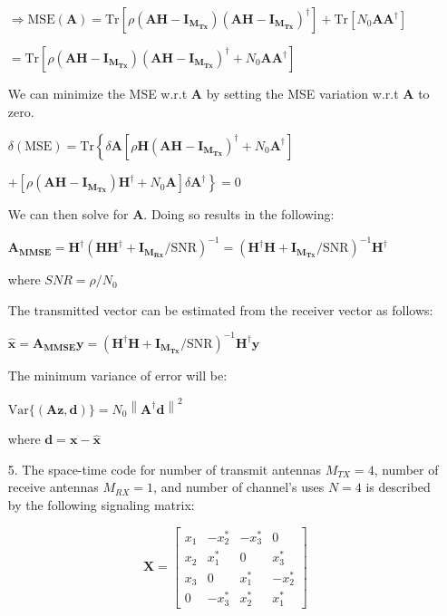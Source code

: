\documentclass[fleqn]{article}
\makeatletter
\newcommand{\norm}[1]{\left \lVert #1 \right \rVert}
\newenvironment{equationCenter}{\@fleqnfalse\begin{equation*}}{\end{equation*}}
\makeatother
\begin{document}
\begin{enumerate}
		$\Rightarrow \text{MSE}(\mathbf{A}) = \text{Tr}[\rho(\mathbf{AH} - \mathbf{I_{M_{Tx}}})(\mathbf{AH} - \mathbf{I_{M_{Tx}}})^{\dagger}] + \text{Tr}[N_0\mathbf{AA^{\dagger}}]$
		
		$ = \text{Tr}[\rho(\mathbf{AH} - \mathbf{I_{M_{Tx}}})(\mathbf{AH} - \mathbf{I_{M_{Tx}}})^{\dagger} + N_0\mathbf{AA^{\dagger}}]$
		
		We can minimize the MSE w.r.t $\mathbf{A}$ by setting the MSE variation w.r.t $\mathbf{A}$ to zero.
		
		$\delta(\text{MSE}) = \text{Tr}\left\{\delta\mathbf{A}[\rho\mathbf{H}(\mathbf{AH} - \mathbf{I_{M_{Tx}}})^{\dagger} + N_0\mathbf{A}^{\dagger}]\right.$
		
		$ \left. + [\rho(\mathbf{AH} - \mathbf{I_{M_{Tx}}})\mathbf{H}^{\dagger} + N_0\mathbf{A}]\delta\mathbf{A}^{\dagger}\right\} = 0$
		
		We can then solve for $\mathbf{A}$. Doing so results in the following:
		
		$\mathbf{A_{MMSE}} = \mathbf{H^{\dagger}}(\mathbf{HH^{\dagger}} + \mathbf{I_{M_{Rx}}}/\text{SNR})^{-1} = (\mathbf{H^{\dagger}H} + \mathbf{I_{M_{Tx}}}/\text{SNR})^{-1}\mathbf{H^{\dagger}}$
		
		where $SNR = \rho/N_0$
		
		The transmitted vector can be estimated from the receiver vector as follows:
		
		$\mathbf{\hat{x}} = \mathbf{A_{MMSE}y} =(\mathbf{H^{\dagger}H} + \mathbf{I_{M_{Tx}}}/\text{SNR})^{-1}\mathbf{H^{\dagger}y}$
		
		The minimum variance of error will be:
		
		$\text{Var}\{(\mathbf{Az},\mathbf{d})\} = N_0\norm{\mathbf{A^{\dagger}d}}^2$
		
		where $\mathbf{d} = \mathbf{x} - \mathbf{\hat{x}}$
		
		\item[5.] The space-time code for number of transmit antennas $M_{TX}=4$, number of receive antennas $M_{RX}=1$, and number of channel's uses $N=4$ is described by the following signaling matrix:
		
		\begin{equationCenter}
			\mathbf{X} = \begin{bmatrix}
				x_1 & -x_2^* & -x_3^* &  0 \\ 
				x_2 &  x_1^* &  0     &  x_3^* \\
				x_3 &  0     &  x_1^* & -x_2^* \\
				0   & -x_3^* &  x_2^* &  x_1^*
			\end{bmatrix}
		\end{equationCenter}
		

\end{enumerate}
\end{document}
